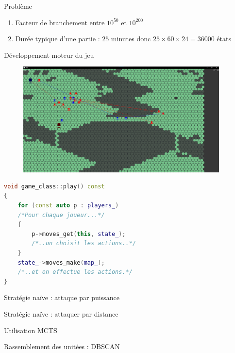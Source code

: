 \documentclass[french]{beamer}
\begin{document}
\begin{frame}{Problème}
	\begin{enumerate}
		\item Facteur de branchement entre $10^{50}$ et $10^{200}$
		\item Durée typique d'une partie : $25$ minutes donc $25\times60\times24=36000$ états
	\end{enumerate}
\end{frame}
\begin{frame}{Développement moteur du jeu}
	\begin{figure}
		\centering
		\begin{minipage}{0.49\textwidth}
			\centering
			
		\end{minipage}\hfill
		\begin{minipage}{0.49\textwidth}
			\centering
			\includegraphics[width=0.95\textwidth]{screen_carte_pleine.png}
		\end{minipage}
	\end{figure}
\end{frame}
\begin{frame}[fragile]
	\small
	\begin{lstlisting}[language=C++,basicstyle=\ttfamily,keywordstyle=\color{red}]
void game_class::play() const
{
    for (const auto p : players_)
    /*Pour chaque joueur...*/
    {
        p->moves_get(this, state_);
        /*..on choisit les actions..*/
    }
    state_->moves_make(map_);
    /*..et on effectue les actions.*/
}
	\end{lstlisting}
\end{frame}
\begin{frame}{Stratégie naïve : attaque par puissance}
	
\end{frame}
\begin{frame}{Stratégie naïve : attaquer par distance}
	
\end{frame}
\begin{frame}{Utilisation MCTS}
	
\end{frame}
\begin{frame}{Rassemblement des unitées : DBSCAN}
	
\end{frame}
\end{document}
